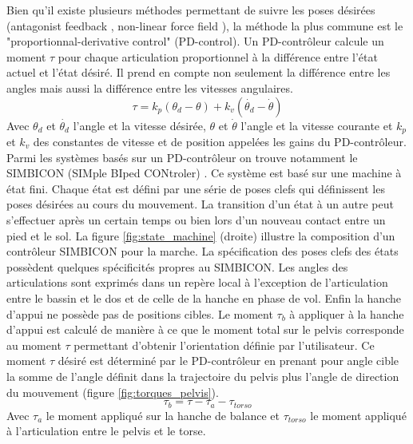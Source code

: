 \documentclass[runningheads,a4paper]{llncs}
\begin{document}
Bien qu'il existe plusieurs méthodes permettant de suivre les poses désirées (antagonist feedback \cite{neff2002modeling}, non-linear force field \cite{mussa1997nonlinear}), la méthode la plus commune est le "proportionnal-derivative control" (PD-control). Un PD-contrôleur calcule un moment  \(\tau\) pour chaque articulation proportionnel à la différence entre l'état actuel et l'état désiré. Il prend en compte non seulement la différence entre les angles mais aussi la différence entre les vitesses angulaires. 
\begin{equation}
\tau=k_p(\theta_d - \theta) + k_v(\dot{\theta_d} - \dot{\theta})
\label{eq:pd_controler}
\end{equation}
Avec \(\theta_d\) et \(\dot{\theta_d}\) l'angle et la vitesse désirée, \(\theta\) et \(\dot{\theta}\) l'angle et la vitesse courante et \(k_p\) et \(k_v\) des constantes de vitesse et de position appelées les gains du PD-contrôleur.
Parmi les systèmes basés sur un PD-contrôleur on trouve notamment le SIMBICON (SIMple BIped CONtroler) \cite{yin2007simbicon}. Ce système est basé sur une machine à état fini. Chaque état est défini par une série de poses clefs qui définissent les poses désirées au cours du mouvement. La transition d'un état à un autre peut s'effectuer après un certain temps ou bien lors d'un nouveau contact entre un pied et le sol. La figure \ref{fig:state_machine} (droite) illustre la composition d'un contrôleur SIMBICON pour la marche. La spécification des poses clefs des états possèdent quelques spécificités propres au SIMBICON. Les angles des articulations sont exprimés dans un repère local à l'exception de l'articulation entre le bassin et le dos et de celle de la hanche en phase de vol. Enfin la hanche d'appui ne possède pas de positions cibles. Le moment \(\tau_b \) à appliquer à la hanche d'appui est calculé de manière à ce que le moment total sur le pelvis corresponde au moment \(\tau \) permettant d'obtenir l'orientation définie par l'utilisateur. Ce moment \(\tau \) désiré est déterminé par le PD-contrôleur en prenant pour angle cible la somme de l'angle définit dans la trajectoire du pelvis plus l'angle de direction du mouvement (figure \ref{fig:torques_pelvis}).
\[
\tau_b=\tau - \tau_a - \tau_{torso}
\]
Avec \(\tau_a \) le moment appliqué sur la hanche de balance et \(\tau_{torso} \) le moment appliqué à l'articulation entre le pelvis et le torse.
\end{document}
